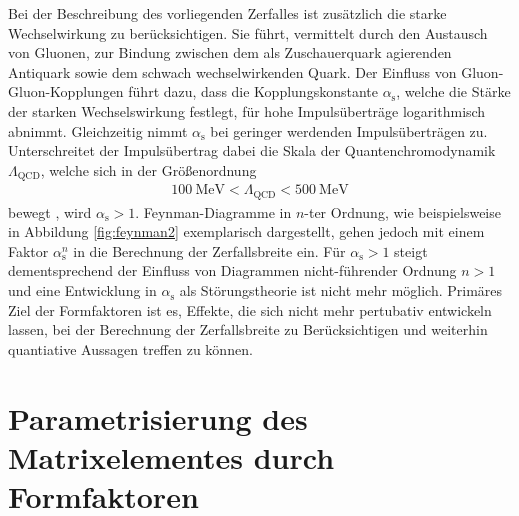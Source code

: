 Bei der Beschreibung des vorliegenden Zerfalles ist zusätzlich die starke Wechselwirkung zu berücksichtigen.
Sie führt, vermittelt durch den Austausch von Gluonen, zur Bindung zwischen dem als Zuschauerquark agierenden Antiquark sowie dem schwach wechselwirkenden Quark.
Der Einfluss von Gluon-Gluon-Kopplungen führt dazu, dass die Kopplungskonstante $\alpha_\text{s}$, welche die Stärke der starken Wechselswirkung festlegt, für hohe Impulsüberträge logarithmisch abnimmt.
Gleichzeitig nimmt $\alpha_\text{s}$ bei geringer werdenden Impulsüberträgen zu.
Unterschreitet der Impulsübertrag dabei die Skala der Quantenchromodynamik $\Lambda_\text{QCD}$, welche sich in der Größenordnung
\begin{align*}
  \SI{100}{\mega\electronvolt} < \Lambda_\text{QCD} < \SI{500}{\mega\electronvolt}
\end{align*}
bewegt \cite{griffiths2008introduction}, wird $\alpha_\text{s} > 1$.
Feynman-Diagramme in $n$-ter Ordnung, wie beispielsweise in Abbildung \ref{fig:feynman2} exemplarisch dargestellt, gehen jedoch mit einem Faktor $\alpha_\text{s}^n$ in die Berechnung der Zerfallsbreite ein.
Für $\alpha_\text{s} > 1$ steigt dementsprechend der Einfluss von Diagrammen nicht-führender Ordnung $n>1$ und eine Entwicklung in $\alpha_\text{s}$ als Störungstheorie ist nicht mehr möglich.
Primäres Ziel der Formfaktoren ist es, Effekte, die sich nicht mehr pertubativ entwickeln lassen, bei der Berechnung der Zerfallsbreite zu Berücksichtigen und weiterhin quantiative Aussagen treffen zu können.

\section{Parametrisierung des Matrixelementes durch Formfaktoren}

